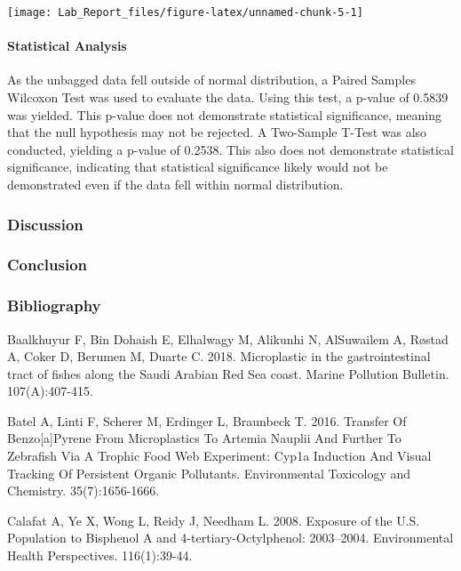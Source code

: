 \documentclass[]{article}
\let\oldparagraph\paragraph
\renewcommand{\paragraph}[1]{\oldparagraph{#1}\mbox{}}
\begin{document}
\begin{center}\texttt{[image: Lab\_Report\_files/figure-latex/unnamed-chunk-5-1]} \end{center}

\hypertarget{statistical-analysis}{%
\paragraph{Statistical Analysis}\label{statistical-analysis}}

As the unbagged data fell outside of normal distribution, a Paired
Samples Wilcoxon Test was used to evaluate the data. Using this test, a
p-value of 0.5839 was yielded. This p-value does not demonstrate
statistical significance, meaning that the null hypothesis may not be
rejected. A Two-Sample T-Test was also conducted, yielding a p-value of
0.2538. This also does not demonstrate statistical significance,
indicating that statistical significance likely would not be
demonstrated even if the data fell within normal distribution.

\hypertarget{discussion}{%
\subsubsection{Discussion}\label{discussion}}

\hypertarget{conclusion}{%
\subsubsection{Conclusion}\label{conclusion}}

\hypertarget{bibliography}{%
\subsubsection{Bibliography}\label{bibliography}}

Baalkhuyur F, Bin Dohaish E, Elhalwagy M, Alikunhi N, AlSuwailem A,
Røstad A, Coker D, Berumen M, Duarte C. 2018. Microplastic in the
gastrointestinal tract of ﬁshes along the Saudi Arabian Red Sea coast.
Marine Pollution Bulletin. 107(A):407-415.~

Batel A, Linti F, Scherer M, Erdinger L, Braunbeck T. 2016. Transfer Of
Benzo{[}a{]}Pyrene From Microplastics To Artemia Nauplii And Further To
Zebrafish Via A Trophic Food Web Experiment: Cyp1a Induction And Visual
Tracking Of Persistent Organic Pollutants. Environmental Toxicology and
Chemistry. 35(7):1656-1666.~

Calafat A, Ye X, Wong L, Reidy J, Needham L. 2008. Exposure of the U.S.
Population to Bisphenol A and 4-tertiary-Octylphenol: 2003--2004.
Environmental Health Perspectives. 116(1):39-44.~
\end{document}
